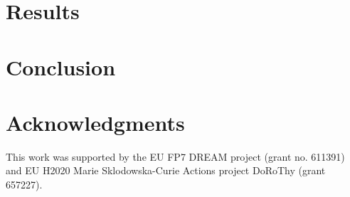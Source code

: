\documentclass[letterpaper]{article} %
\begin{document}
\section{Results}
\section{Conclusion}
\label{sec:conclusion}
\section{Acknowledgments}
This work was supported by the EU FP7 DREAM project (grant no.  611391) and EU
H2020 Marie Sklodowska-Curie Actions project DoRoThy (grant 657227).  

 
\end{document}
